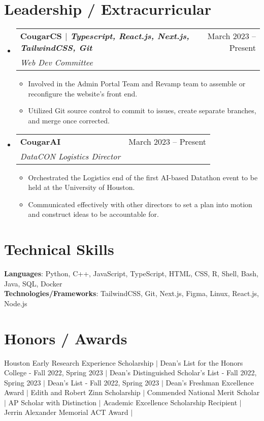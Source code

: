 \documentclass[letterpaper,11pt]{article}
\makeatletter
\newcommand{\resumeItem}[1]{
  \item\small{
    {#1 \vspace{-2pt}}
  }
}
\newcommand{\resumeSubheading}[4]{
  \vspace{-2pt}\item
    \begin{tabular*}{0.97\textwidth}[t]{l@{\extracolsep{\fill}}r}
      \textbf{#1} & #2 \\
      \textit{\small#3} & \textit{\small #4} \\
    \end{tabular*}\vspace{-7pt}
}
\newcommand{\resumeSubHeadingListStart}{\begin{itemize}[leftmargin=0.15in, label={}]}
\newcommand{\resumeSubHeadingListEnd}{\end{itemize}}
\newcommand{\resumeItemListStart}{\begin{itemize}}
\newcommand{\resumeItemListEnd}{\end{itemize}\vspace{-5pt}}
\makeatother
\begin{document}
\section{Leadership / Extracurricular}
    \resumeSubHeadingListStart
        \resumeSubheading{CougarCS $|$ \emph{Typescript, React.js, Next.js, TailwindCSS, Git}}{March 2023 -- Present}{Web Dev Committee}{}
            \resumeItemListStart
                \resumeItem{Involved in the Admin Portal Team and Revamp team to assemble or reconfigure the website's front end.}
                \resumeItem{Utilized Git source control to commit to issues, create separate branches, and merge once corrected.}
            \resumeItemListEnd
            \resumeSubheading{CougarAI}{March 2023 -- Present}{DataCON Logistics Director}{}
            \resumeItemListStart
                \resumeItem{Orchestrated the Logistics end of the first AI-based Datathon event to be held at the University of Houston.}
                \resumeItem{Communicated effectively with other directors to set a plan into motion and construct ideas to be accountable for.}
            \resumeItemListEnd
        
    \resumeSubHeadingListEnd


%
\section{Technical Skills}
 \begin{itemize}[leftmargin=0.15in, label={}]
    \small{\item{
     \textbf{Languages}{: Python, C++, JavaScript, TypeScript, HTML, CSS, R, Shell, Bash, Java, SQL, Docker} \\
     \textbf{Technologies/Frameworks}{: TailwindCSS, Git, Next.js, Figma, Linux, React.js, Node.js}
    }}
 \end{itemize}

 \section{Honors / Awards}
 \begin{itemize}[leftmargin=0.15in, label={}]
    \small{\item{
     \textbf{}{Houston Early Research Experience Scholarship $|$ Dean’s List for the Honors College - Fall 2022, Spring 2023 $|$ Dean’s Distinguished Scholar’s List - Fall 2022, Spring 2023 $|$ Dean’s List - Fall 2022, Spring 2023 $|$ Dean’s Freshman Excellence Award $|$ Edith and Robert Zinn Scholarship $|$ Commended National Merit Scholar $|$ AP Scholar with Distinction $|$ Academic Excellence Scholarship Recipient $|$ Jerrin Alexander Memorial ACT Award $|$}{} \\
    }}
 \end{itemize}


\end{document}

